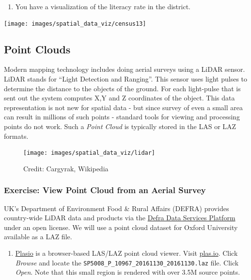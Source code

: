 \documentclass[
  12pt,
  a4paper]{article}
\providecommand{\tightlist}{%
  \setlength{\itemsep}{0pt}\setlength{\parskip}{0pt}}
\begin{document}
\begin{enumerate}
\def\labelenumi{\arabic{enumi}.}
\setcounter{enumi}{12}
\tightlist
\item
  You have a visualization of the literacy rate in the district.
\end{enumerate}

\begin{center}\texttt{[image: images/spatial\_data\_viz/census13]} \end{center}

\newpage

\hypertarget{point-clouds}{%
\subsection{Point Clouds}\label{point-clouds}}

Modern mapping technology includes doing aerial surveys using a LiDAR
sensor. LiDAR stands for ``Light Detection and Ranging''. This sensor
uses light pulses to determine the distance to the objects of the
ground. For each light-pulse that is sent out the system computes X,Y
and Z coordinates of the object. This data representation is not new for
spatial data - but since survey of even a small area can result in
millions of such points - standard tools for viewing and processing
points do not work. Such a \emph{Point Cloud} is typically stored in the
LAS or LAZ formats.

\begin{figure}

{\centering \texttt{[image: images/spatial\_data\_viz/lidar]} 

}

\caption{Credit: Cargyrak, Wikipedia}\label{fig:unnamed-chunk-81}
\end{figure}

\hypertarget{exercise-view-point-cloud-from-an-aerial-survey}{%
\subsubsection{Exercise: View Point Cloud from an Aerial
Survey}\label{exercise-view-point-cloud-from-an-aerial-survey}}

UK's Department of Environment Food \& Rural Affairs (DEFRA) provides
country-wide LiDAR data and products via the
\href{https://environment.data.gov.uk/}{Defra Data Services Platform}
under an open license. We will use a point cloud dataset for Oxford
University available as a LAZ file.

\begin{enumerate}
\def\labelenumi{\arabic{enumi}.}
\tightlist
\item
  \href{https://github.com/verma/plasio}{Plasio} is a browser-based
  LAS/LAZ point cloud viewer. Visit \href{https://plas.io/}{plas.io}.
  Click \emph{Browse} and locate the
  \texttt{SP5008\_P\_10967\_20161130\_20161130.laz} file. Click
  \emph{Open}. Note that this small region is rendered with over 3.5M
  source points.
\end{enumerate}
\end{document}
